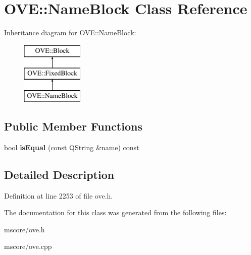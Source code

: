 \hypertarget{class_o_v_e_1_1_name_block}{}\section{O\+VE\+:\+:Name\+Block Class Reference}
\label{class_o_v_e_1_1_name_block}
Inheritance diagram for O\+VE\+:\+:Name\+Block\+:\begin{figure}[H]
\begin{center}
\leavevmode
\includegraphics[height=3.000000cm]{class_o_v_e_1_1_name_block}
\end{center}
\end{figure}
\subsection*{Public Member Functions}
\begin{DoxyCompactItemize}
\item 
\mbox{\label{class_o_v_e_1_1_name_block_a947877ab3fddb89f3bf155c6431a6703}} 
bool {\bfseries is\+Equal} (const Q\+String \&name) const
\end{DoxyCompactItemize}


\subsection{Detailed Description}


Definition at line 2253 of file ove.\+h.



The documentation for this class was generated from the following files\+:\begin{DoxyCompactItemize}
\item 
mscore/ove.\+h\item 
mscore/ove.\+cpp\end{DoxyCompactItemize}
